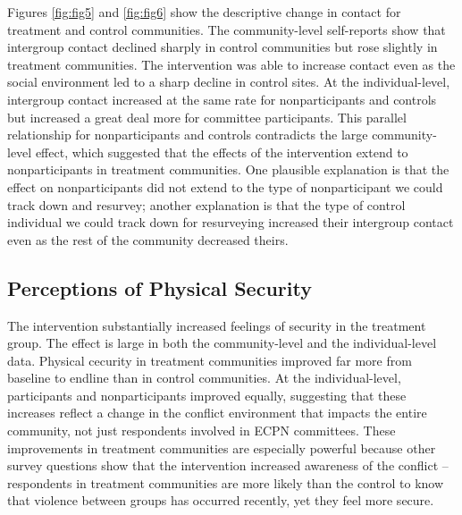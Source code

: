 \documentclass[11pt]{article}
\begin{document}
Figures \ref{fig:fig5} and \ref{fig:fig6} show the descriptive change in
contact for treatment and control communities. The community-level
self-reports show that intergroup contact declined sharply in control
communities but rose slightly in treatment communities. The intervention
was able to increase contact even as the social environment led to a
sharp decline in control sites. At the individual-level, intergroup
contact increased at the same rate for nonparticipants and controls but
increased a great deal more for committee participants. This parallel
relationship for nonparticipants and controls contradicts the large
community-level effect, which suggested that the effects of the
intervention extend to nonparticipants in treatment communities. One
plausible explanation is that the effect on nonparticipants did not
extend to the type of nonparticipant we could track down and resurvey;
another explanation is that the type of control individual we could
track down for resurveying increased their intergroup contact even as
the rest of the community decreased theirs.

\hypertarget{perceptions-of-physical-security}{%
\subsection{Perceptions of Physical
Security}\label{perceptions-of-physical-security}}

The intervention substantially increased feelings of security in the
treatment group. The effect is large in both the community-level and the
individual-level data. Physical cecurity in treatment communities
improved far more from baseline to endline than in control communities.
At the individual-level, participants and nonparticipants improved
equally, suggesting that these increases reflect a change in the
conflict environment that impacts the entire community, not just
respondents involved in ECPN committees. These improvements in treatment
communities are especially powerful because other survey questions show
that the intervention increased awareness of the conflict -- respondents
in treatment communities are more likely than the control to know that
violence between groups has occurred recently, yet they feel more
secure.
\end{document}

